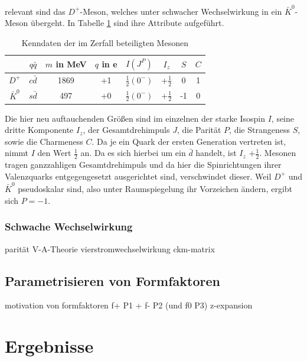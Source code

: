\documentclass[11pt,a4paper,twoside]{report}
\begin{document}
relevant sind das $D^+$-Meson, welches unter schwacher Wechselwirkung in ein $\bar K^0$-Meson übergeht. In Tabelle \ref{tab_DKMeson} sind ihre Attribute
aufgeführt.
\begin{table}[H]
\begin{tabular}{c|ccc|cccc} \toprule 
  & $q\bar q$ &  $m$ in MeV & $q$ in e & $I(J^P)$ & $I_z$ & $S$ & $C$\\
 \midrule
  $D^+$ & $c\bar d$ & 1869  & +1 & $\frac12(0^-)$ & +$\frac12$ & 0 & 1\\
 $\bar K^0$ & $s\bar d$ & 497  & +0 & $\frac12(0^-)$ & +$\frac12$ & -1& 0
\\\bottomrule \bottomrule
 \end{tabular}
\caption{Kenndaten der im Zerfall beteiligten Mesonen}
\label{tab_DKMeson}
\end{table}
\noindent
Die hier neu auftauchenden Größen sind im einzelnen der starke Isospin $I$, seine dritte Komponente $I_z$, der Gesamtdrehimpuls $J$, die Parität $P$, die
Strangeness $S$, sowie die Charmeness $C$. Da je ein Quark der ersten Generation vertreten ist, nimmt $I$ den Wert $\frac12$ an. Da es sich hierbei um ein 
$\bar d$ handelt, ist $I_z$ $+\frac12$. Mesonen tragen ganzzahligen Gesamtdrehimpuls und da hier die Spinrichtungen ihrer Valenzquarks entgegengesetzt 
ausgerichtet sind, verschwindet dieser. Weil $D^+$ und $\bar K^0$ pseudoskalar sind, also unter Raumspiegelung ihr Vorzeichen ändern, ergibt sich $P=-1$.

\subsection{Schwache Wechselwirkung}
parität
V-A-Theorie
vierstromwechselwirkung
ckm-matrix


\section{Parametrisieren von Formfaktoren}
motivation von formfaktoren
f+ P1 + f- P2 (und f0 P3)
z-expansion

\chapter{Ergebnisse}
\end{document}
